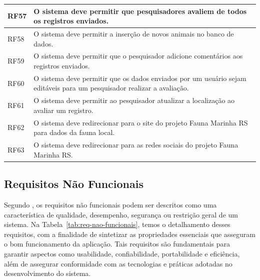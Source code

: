 \begin{longtable}{@{}p{1.5cm}p{13cm}@{}}
    RF57 & O sistema deve permitir que pesquisadores avaliem de todos os registros enviados. \\ \hline
    RF58 & O sistema deve permitir a inserção de novos animais no banco de dados. \\ \hline
    RF59 & O sistema deve permitir que o pesquisador adicione comentários aos registros enviados. \\ \hline
    RF60 & O sistema deve permitir que os dados enviados por um usuário sejam editáveis para um pesquisador realizar
    a avaliação. \\ \hline
    RF61 & O sistema deve permitir ao pesquisador atualizar a localização ao avaliar um registro. \\ \hline

    RF62 & O sistema deve redirecionar para o site do projeto Fauna Marinha RS para dados da fauna local. \\ \hline
    RF63 & O sistema deve redirecionar para as redes sociais do projeto Fauna Marinha RS. \\ \hline
\end{longtable}

\subsection{Requisitos Não Funcionais}

Segundo , os requisitos não funcionais podem ser descritos 
como uma característica de qualidade, desempenho, segurança ou restrição geral de um sistema. 
Na Tabela~\ref{tab:req-nao-funcionais}, temos o detalhamento desses requisitos, com a finalidade 
de sintetizar as propriedades essenciais que asseguram o bom funcionamento da aplicação. 
Tais requisitos são fundamentais 
para garantir aspectos como usabilidade, confiabilidade, portabilidade e eficiência, além de assegurar 
conformidade com as tecnologias e práticas adotadas no desenvolvimento do sistema.

